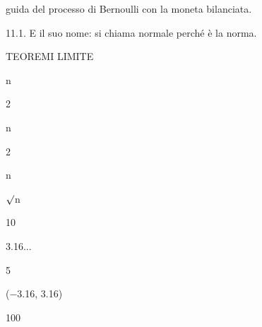 \documentclass[a4paper,portrait,12pt]{article}
\begin{document}
\begin{flushleft}
guida del processo di Bernoulli con la moneta bilanciata.
\end{flushleft}


\begin{flushleft}
11.1. E il suo nome: si chiama normale perch\'{e} \`{e} la norma.
\end{flushleft}










\begin{flushleft}
TEOREMI LIMITE
\end{flushleft}





\begin{flushleft}
n
\end{flushleft}


2





\begin{flushleft}
n
\end{flushleft}


2





\begin{flushleft}
n
\end{flushleft}





\begin{flushleft}
$\surd$n
\end{flushleft}





10





3.16...





5





($-$3.16, 3.16)





100
\end{document}
